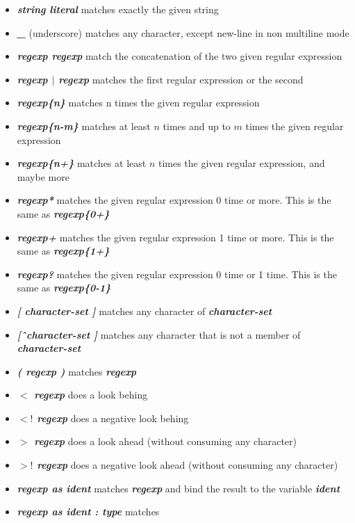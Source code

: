 \documentclass{article}
\begin{document}
\begin{itemize}
\item \textbf{\emph{string literal}} matches exactly the given string
\item \textbf{\emph{\_}} (underscore) matches any character, except
  new-line in non multiline mode
\item \textbf{\emph{regexp regexp}} match the concatenation of the two
  given regular expression
\item \textbf{\emph{regexp $\mid$ regexp}} matches the first regular
  expression or the second
\item \textbf{\emph{regexp\{n\}}} matches n times the given regular
  expression
\item \textbf{\emph{regexp\{n-m\}}} matches at least $n$ times and up to
  $m$ times the given regular expression
\item \textbf{\emph{regexp\{n+\}}} matches at least $n$ times the given
  regular expression, and maybe more
\item \textbf{\emph{regexp*}} matches the given regular expression 0
  time or more. This is the same as \textbf{\emph{regexp\{0+\}}}
\item \textbf{\emph{regexp+}} matches the given regular expression 1
  time or more. This is the same as \textbf{\emph{regexp\{1+\}}}
\item \textbf{\emph{regexp?}} matches the given regular expression 0
  time or 1 time. This is the same as \textbf{\emph{regexp\{0-1\}}}
\item \textbf{\emph{[ character-set ]}} matches any character of
  \textbf{\emph{character-set}}
\item \textbf{\emph{[\^\ character-set ]}} matches any character that
  is not a member of \textbf{\emph{character-set}}
\item \textbf{\emph{( regexp )}} matches \textbf{\emph{regexp}}
\item \textbf{\emph{$<$ regexp}} does a look behing
\item \textbf{\emph{$<!$ regexp}} does a negative look behing
\item \textbf{\emph{$>$ regexp}} does a look ahead (without consuming any character)
\item \textbf{\emph{$>!$ regexp}} does a negative look ahead (without consuming any character)
\item \textbf{\emph{regexp as ident}} matches \textbf{\emph{regexp}}
  and bind the result to the variable \textbf{\emph{ident}}
\item \textbf{\emph{regexp as ident : type}} matches

\end{itemize}
\end{document}

